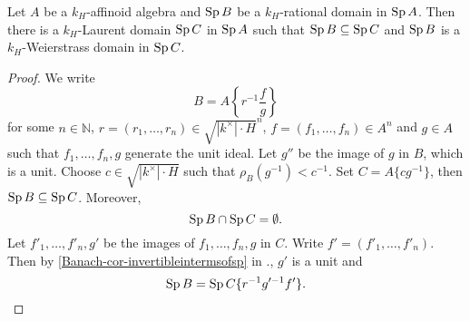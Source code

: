 \begin{proposition}\label{prop-rationaldomaindecomp}
    Let $A$ be a $k_H$-affinoid algebra and $\operatorname{Sp} B$ be a $k_H$-rational domain in $\operatorname{Sp} A$. Then there is a $k_H$-Laurent domain $\operatorname{Sp} C$ in $\operatorname{Sp} A$ such that $\operatorname{Sp} B\subseteq \operatorname{Sp} C$ and $\operatorname{Sp} B$ is a $k_H$-Weierstrass domain in $\operatorname{Sp} C$.
\end{proposition}
\begin{proof}
    We write 
    \[
        B=A\left\{r^{-1}\frac{f}{g}\right\}  
    \]
    for some $n\in \mathbb{N}$, $r=(r_1,\ldots,r_n)\in \sqrt{|k^{\times}|\cdot H}^n$, $f=(f_1,\ldots,f_n)\in A^n$ and $g\in A$ such that $f_1,\ldots,f_n,g$ generate the unit ideal. Let $g''$ be the image of $g$ in $B$, which is a unit. Choose $c\in \sqrt{|k^{\times}|\cdot H}$ such that $\rho_B(g^{-1})<c^{-1}$. Set $C=A\{c g^{-1}\}$, then $\operatorname{Sp} B\subseteq \operatorname{Sp} C$. Moreover,
    \[
        \operatorname{Sp} B\cap \operatorname{Sp} C=\emptyset.  
    \]
    Let $f'_1,\ldots,f'_n,g'$ be the images of $f_1,\ldots,f_n,g$ in $C$. Write $f'=(f'_1,\ldots,f'_n)$. Then by \cref{Banach-cor-invertibleintermsofsp} in ., $g'$ is a unit and 
    \[
        \operatorname{Sp} B=\operatorname{Sp} C\{r^{-1} g'^{-1}f'\}.  
    \]
\end{proof}

